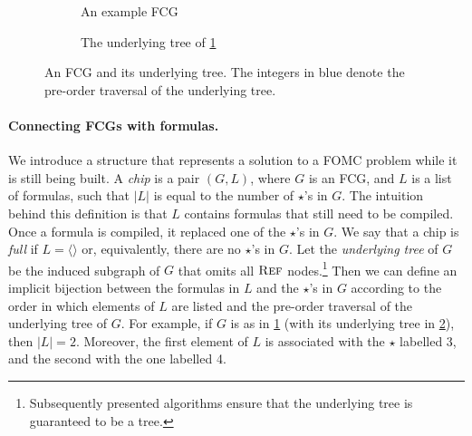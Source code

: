 \begin{figure}
  \centering
  \begin{subfigure}{0.49\textwidth}
    \centering
    \caption{An example FCG}\label{fig:smallexample1}
  \end{subfigure}
  \begin{subfigure}{0.49\textwidth}
    \centering
    \caption{The underlying tree of \cref{fig:smallexample1}}\label{fig:smallexample2}
  \end{subfigure}
  \caption{An FCG and its underlying tree. The integers in blue denote the
    pre-order traversal of the underlying tree.}\label{fig:ordering}
\end{figure}

\paragraph{Connecting FCGs with formulas.} We introduce a structure that
represents a solution to a FOMC problem while it is still being built. A
\emph{chip} is a pair $(G, L)$, where $G$ is an FCG, and $L$ is a list of
formulas, such that $|L|$ is equal to the number of $\star$'s in $G$. The
intuition behind this definition is that $L$ contains formulas that still need
to be compiled. Once a formula is compiled, it replaced one of the $\star$'s in
$G$. We say that a chip is \emph{full} if $L = \langle \rangle$ or,
equivalently, there are no $\star$'s in $G$. Let the \emph{underlying tree} of
$G$ be the induced subgraph of $G$ that omits all $\operatorname{\textsc{Ref}}$
nodes.\footnote{Subsequently presented algorithms ensure that the underlying
  tree is guaranteed to be a tree.} Then we can define an implicit bijection
between the formulas in $L$ and the $\star$'s in $G$ according to the order in
which elements of $L$ are listed and the pre-order traversal of the underlying
tree of $G$. For example, if $G$ is as in \cref{fig:smallexample1} (with its
underlying tree in \cref{fig:smallexample2}), then $|L| = 2$. Moreover, the
first element of $L$ is associated with the $\star$ labelled 3, and the second
with the one labelled 4.

